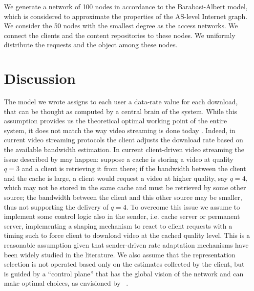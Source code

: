 \documentclass[10pt, journal,letterpaper]{IEEEtran}
\begin{document}
We generate a network of 100 nodes in accordance to the Barabasi-Albert model, which is considered to approximate the properties of the AS-level Internet graph.
We consider the 50 nodes with the smallest degree as the access networks. We connect the clients and the content repositories to these nodes. We uniformly distribute the requests and the object among these nodes.







\section{Discussion}
The model we wrote assigns to each user a data-rate value for each download, that can be thought as computed by a central brain of the system. While this assumption provides us the theoretical optimal working point of the entire system, it does not match the way video streaming is done today
. Indeed, in current video streaming protocols the client adjusts the download rate based on the available bandwidth estimation. In current client-driven video streaming the issue described by\cite{Lee2014} may happen: suppose a cache is storing a video at quality $q=3$ and a client is retrieving it from there; if the bandwidth between the client and the cache is large, a client would request a video at higher quality, say $q=4$, which may not be stored in the same cache and must be retrieved by some other source; the bandwidth between the client and this other source may be smaller, thus not supporting the delivery of $q=4$. To overcome this issue we assume to implement some control logic also in the sender, i.e. cache server or permanent server, implementing a shaping mechanism to react to client requests with a timing such to force client to download video at the cached quality level. This is a reasonable assumption given that sender-driven rate adaptation mechanisms have been widely studied in the literature. We also assume that the representation selection is not operated based only on the estimates collected by the client, but is guided by a ``control plane'' that has the global vision of the network and can make optimal choices, as envisioned by ~\cite{Liu2012a}.
\end{document}
